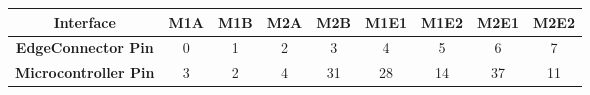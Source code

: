 \begin{tabular}{|c|c|c|c|c|c|c|c|c|}
    \hline
    \textbf{Interface}           & M1A & M1B & M2A & M2B & M1E1 & M1E2 & M2E1 & M2E2 \\
    \hline
    \textbf{EdgeConnector Pin}   & 0   & 1   & 2   & 3   & 4    & 5    & 6    & 7    \\
    \hline
    \textbf{Microcontroller Pin} & 3   & 2   & 4   & 31  & 28   & 14   & 37   & 11   \\
    \hline
\end{tabular}
